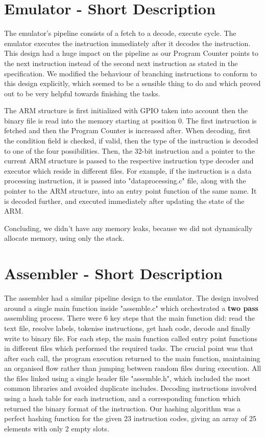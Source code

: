\documentclass[11pt,a4paper]{article}
\begin{document}
\section{Emulator - Short Description}

The emulator's pipeline consists of a fetch to a decode, execute cycle. The emulator executes the instruction immediately after it decodes the instruction. This design had a huge impact on the pipeline as our Program Counter points to the next instruction instead of the second next instruction as stated in the specification. We modified the behaviour of branching instructions to conform to this design explicitly, which seemed to be a sensible thing to do and which proved out to be very helpful towards finishing the tasks. 

The ARM structure is first initialized with GPIO taken into account then the binary file is read into the memory starting at position 0. The first instruction is fetched and then the Program Counter is increased after. When decoding, first the condition field is checked, if valid, then the type of the instruction is decoded to one of the four possibilities. Then, the 32-bit instruction and a pointer to the current ARM structure is passed to the respective instruction type decoder and executor which reside in different files. For example, if the instruction is a data processing instruction, it is passed into "dataprocessing.c" file, along with the pointer to the ARM structure, into an entry point function of the same name. It is decoded further, and executed immediately after updating the state of the ARM. 

Concluding, we didn't have any memory leaks, because we did not dynamically allocate memory, using only the stack.

\section{Assembler - Short Description}

The assembler had a similar pipeline design to the emulator. The design involved around a single main function inside "assemble.c" which orchestrated a \textbf{two pass} assembling process. There were 6 key steps that the main function did: read the text file, resolve labels, tokenise instructions, get hash code, decode and finally write to binary file. For each step, the main function called entry point functions in different files which performed the required tasks. The crucial point was that after each call, the program execution returned to the main function, maintaining an organised flow rather than jumping between random files during execution. All the files linked using a single header file "assemble.h", which included the most common libraries and avoided duplicate includes. Decoding instructions involved using a hash table for each instruction, and a corresponding function which returned the binary format of the instruction. Our hashing algorithm was a perfect hashing function for the given 23 instruction codes, giving an array of 25 elements with only 2 empty slots. 
\end{document}

